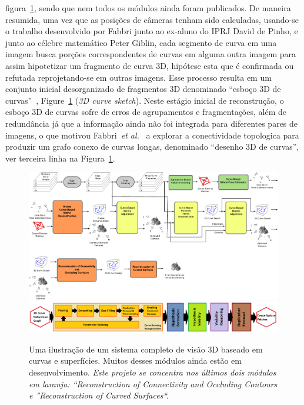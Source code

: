 \documentclass[a4paper,titlepage]{article}
\newcommand{\etal}{{\it et al.}}
\begin{document}
figura~\ref{fig:lofting:pipeline}, sendo que nem todos os módulos ainda foram
publicados.
De maneira resumida, uma vez que as posições de câmeras tenham sido calculadas,
usando-se o trabalho desenvolvido por Fabbri junto ao ex-aluno do IPRJ David de Pinho,
e junto ao célebre matemático Peter Giblin,
cada segmento de curva em uma imagem busca porções correspondentes de curvas em
alguma outra imagem para assim hipotetizar um fragmento de curva 3D, hipótese
esta que é confirmada ou refutada reprojetando-se em outras imagens. Esse
processo resulta em um conjunto inicial desorganizado de fragmentos 3D
denominado ``esboço 3D de
curvas''~\cite{fabbri2011multiview,fabbri2016multiview},
Figure~\ref{fig:lofting:pipeline} (\emph{3D curve sketch}). Neste estágio
inicial de reconstrução, o esboço 3D de curvas sofre de erros de agrupamentos e
fragmentações, além de redundância já que a informação ainda não foi integrada
para diferentes pares de imagens, o que motivou Fabbri~\etal~\cite{usumezbas2016multiview}
a explorar a conectividade topologica  para produzir um grafo conexo de
curvas longas, denominado ``desenho 3D de curvas'', ver terceira linha na
Figura~\ref{fig:lofting:pipeline}.
\begin{figure}
  \begin{center}
    \includegraphics[width=\linewidth]{figs/mega-system-drawing-pt.pdf}
    \includegraphics[width=\linewidth]{figs/lofting-pipeline.png}
  \end{center}
  \caption{Uma ilustração de um sistema completo de visão 3D baseado em curvas e
  superfícies. Muitos desses módulos ainda estão em desenvolvimento. \emph{Este
projeto se concentra nos últimos dois módulos em laranja: ``Reconstruction of
Connectivity and Occluding Contours e ''Reconstruction of Curved Surfaces``.}}
  \label{fig:lofting:pipeline}
\end{figure}
\end{document}
